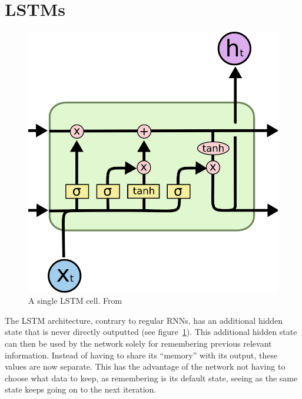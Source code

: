 \section{LSTMs}

\begin{figure}
	\begin{center}
		\includegraphics[scale=0.5]{rnn/lstm_cell}
	\end{center}
	\caption{A single LSTM cell. From~\cite{olah2015understanding}\label{fig:lstm_cell}}
\end{figure}

The LSTM architecture, contrary to regular RNNs, has an additional hidden state that is never directly outputted (see figure~\ref{fig:lstm_cell}). This additional hidden state can then be used by the network solely for remembering previous relevant information. Instead of having to share its \enquote{memory} with its output, these values are now separate. This has the advantage of the network not having to choose what data to keep, as remembering is its default state, seeing as the same state keeps going on to the next iteration.

